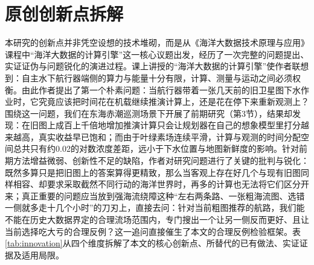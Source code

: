 \section{原创创新点拆解}

本研究的创新点并非凭空设想的技术堆砌，而是从《海洋大数据技术原理与应用》课程中“海洋大数据的计算引擎”这一核心议题出发，经历了一次完整的问题提出、实证证伪与问题锐化的演进过程。课上讲授的“海洋大数据的计算引擎”使作者联想到：自主水下航行器端侧的算力与能量十分有限，计算、测量与运动之间必须权衡。由此作者提出了第一个朴素问题：当航行器带着一张几天前的旧卫星图下水作业时，它究竟应该把时间花在机载继续推演计算上，还是花在停下来重新观测上？围绕这一问题，我们在东海赤潮巡测场景下开展了前期研究（第3节），结果却发现：在旧图上成百上千倍地增加推演计算只会让规划器在自己的想象模型里打分越来越高，真实收益早已饱和；而由于叶绿素场连续平滑，计算与观测的时间分配空间总共只有约0.02的对数浓度差距，远小于下水位置与地图新鲜度的影响。针对前期方法增益微弱、创新性不足的缺陷，作者对研究问题进行了关键的批判与锐化：既然多算只是把旧图上的答案算得更精致，那么当客观上存在好几个与现有旧图同样相容、却要求采取截然不同行动的海洋世界时，再多的计算也无法将它们区分开来；真正重要的问题应当放到强海流绕障这种“左右两条路、一张粗海流图、选错一侧就多走十几个小时”的刀刃上，直接去问：针对当前粗图推荐的航路，我们能不能在历史大数据界定的合理流场范围内，专门搜出一个让另一侧反而更好、且让当前选择吃大亏的合理反例？这一追问直接催生了本文的合理反例检验框架。表\ref{tab:innovation}从四个维度拆解了本文的核心创新点、所替代的已有做法、实证证据及适用局限。

